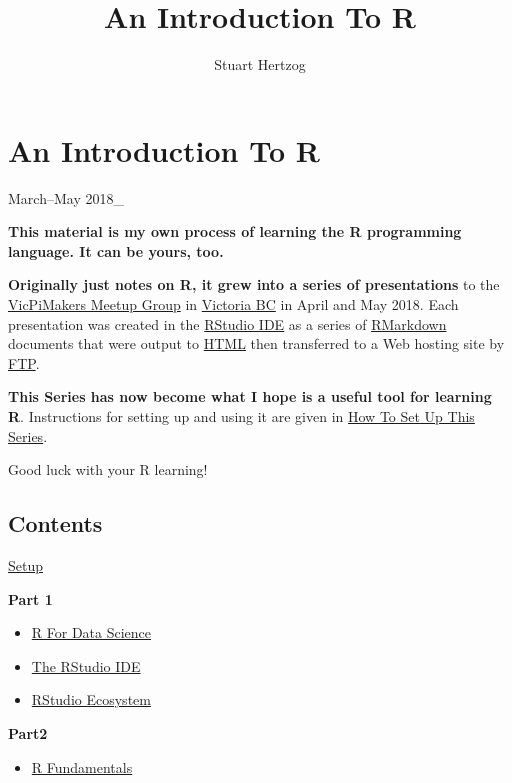 \documentclass[]{book}
\title{An Introduction To R}
\author{Stuart Hertzog}
\date{}
\providecommand{\tightlist}{%
  \setlength{\itemsep}{0pt}\setlength{\parskip}{0pt}}
\theoremstyle{definition}
\theoremstyle{definition}
\theoremstyle{definition}
\theoremstyle{remark}
\begin{document}
\maketitle

{
\setcounter{tocdepth}{1}
\tableofcontents
}
\hypertarget{index}{%
\chapter{An Introduction To R}\label{index}}

March--May 2018\_

\textbf{This material is my own process of learning the R programming
language. It can be yours, too.}

\textbf{Originally just notes on R, it grew into a series of
presentations} to the
\href{https://www.meetup.com/Victoria-Raspberry-PiMakers-And-Others/}{VicPiMakers
Meetup Group} in \href{https://www.tourismvictoria.com/}{Victoria BC} in
April and May 2018. Each presentation was created in the
\href{https://www.rstudio.com/}{RStudio IDE} as a series of
\href{http://rmarkdown.rstudio.com/}{RMarkdown} documents that were
output to \href{https://en.wikipedia.org/wiki/HTML}{HTML} then
transferred to a Web hosting site by
\href{https://en.wikipedia.org/wiki/File_Transfer_Protocol}{FTP}.

\textbf{This Series has now become what I hope is a useful tool for
learning R}. Instructions for setting up and using it are given in
\href{Setup.html}{How To Set Up This Series}.

Good luck with your R learning!

\hypertarget{contents}{%
\section{Contents}\label{contents}}

\href{Setup.html}{Setup}

\textbf{Part 1}

\begin{itemize}
\tightlist
\item
  \href{Part1_R_Data_Science.html}{R For Data Science}
\item
  \href{RStudio.html}{The RStudio IDE}
\item
  \href{RStudio_Ecosystem.html}{RStudio Ecosystem}
\end{itemize}

\textbf{Part2}

\begin{itemize}
\tightlist
\item
  \href{Part2_R_Programming.html}{R Fundamentals}
\end{itemize}
\end{document}
